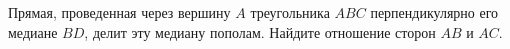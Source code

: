 \begin{ex}
	\begin{condition}
		Прямая,  проведенная  через  вершину  \( A \)  треугольника \( ABC \) перпендикулярно его медиане \( BD \), 
		делит эту медиану пополам. Найдите отношение сторон \( AB \) и \( AC \).
	\end{condition}
\end{ex}